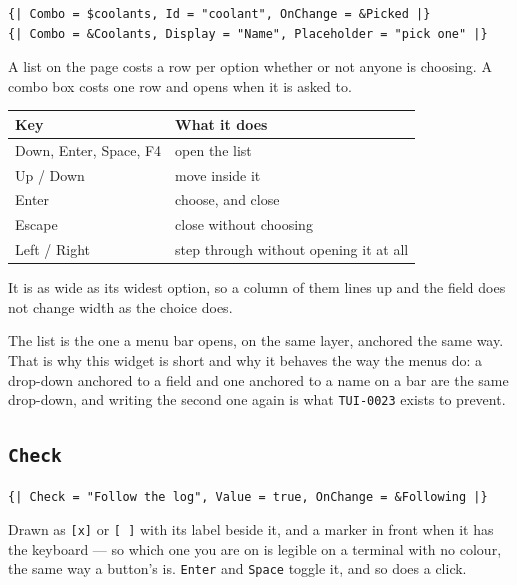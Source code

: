 \documentclass[11pt,a4paper,twoside,openany]{book}
\newcommand{\code}[1]{\texttt{\small #1}}
\begin{document}
\begin{lstlisting}
{| Combo = $coolants, Id = "coolant", OnChange = &Picked |}
{| Combo = &Coolants, Display = "Name", Placeholder = "pick one" |}
\end{lstlisting}

A list on the page costs a row per option whether or not anyone is choosing. A
combo box costs one row and opens when it is asked to.

\begin{center}
\begin{tabular}{@{}ll@{}}
\toprule
\textbf{\normalfont\sffamily Key} & \textbf{\normalfont\sffamily What it does} \\
\midrule
Down, Enter, Space, F4 & open the list \\
Up / Down              & move inside it \\
Enter                  & choose, and close \\
Escape                 & close without choosing \\
Left / Right           & step through without opening it at all \\
\bottomrule
\end{tabular}
\end{center}

It is as wide as its widest option, so a column of them lines up and the field does
not change width as the choice does.

\begin{aside}
The list is the one a menu bar opens, on the same layer, anchored the same way. That
is why this widget is short and why it behaves the way the menus do: a drop-down
anchored to a field and one anchored to a name on a bar are the same drop-down, and
writing the second one again is what \code{TUI-0023} exists to prevent.
\end{aside}

\subsection{\texttt{Check}}

\begin{lstlisting}
{| Check = "Follow the log", Value = true, OnChange = &Following |}
\end{lstlisting}

Drawn as \code{[x]} or \code{[\ ]} with its label beside it, and a marker in front
when it has the keyboard --- so which one you are on is legible on a terminal with
no colour, the same way a button's is. \code{Enter} and \code{Space} toggle it, and
so does a click.
\end{document}
